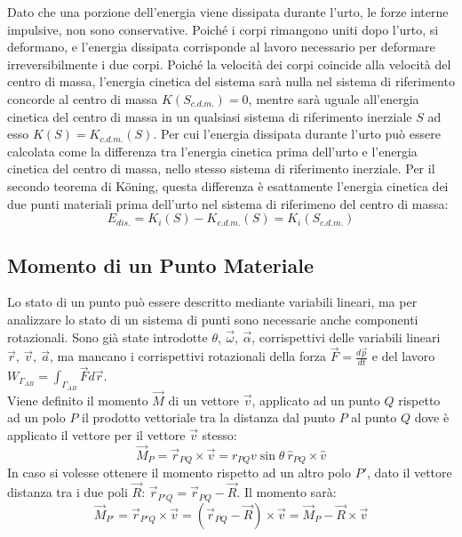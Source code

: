 \documentclass{article}
\numberwithin{equation}{subsection}
\begin{document}
Dato che una porzione dell'energia viene dissipata durante l'urto, le forze interne impulsive, non sono conservative. Poiché i corpi rimangono 
uniti dopo l'urto, si deformano, e l'energia dissipata corrisponde al lavoro necessario per deformare irreversibilmente i due corpi. 
Poiché la velocità dei corpi coincide alla velocità del centro di massa, 
l'energia cinetica del sistema sarà nulla nel sistema di 
riferimento concorde al centro di massa $K(S_{c.d.m.})=0$, mentre sarà uguale all'energia 
cinetica del centro di massa in un qualsiasi sistema di riferimento inerziale $S$ 
ad esso $K(S)=K_{c.d.m.}(S)$. Per cui l'energia dissipata durante l'urto può essere calcolata come la differenza tra l'energia cinetica prima dell'urto e 
l'energia cinetica del centro di massa, nello stesso sistema di riferimento inerziale. Per il secondo teorema di K\"oning, questa differenza è esattamente l'energia cinetica dei due punti materiali prima dell'urto 
nel sistema di riferimeno del centro di massa: 
\begin{equation}
    E_{dis.}=K_i(S)-K_{c.d.m.}(S)=K_i(S_{c.d.m.})
\end{equation}

\subsection{Momento di un Punto Materiale}


Lo stato di un punto può essere descritto mediante variabili 
lineari, ma per analizzare lo stato di un sistema di punti 
sono necessarie anche componenti rotazionali. Sono già state 
introdotte $\theta,\:\vec{\omega},\:\vec{\alpha}$, corrispettivi 
delle variabili lineari $\vec{r},\:\vec{v},\:\vec{a}$, ma 
mancano i corrispettivi rotazionali della forza $\vec{F}=\displaystyle\frac{d\vec{p}}{dt}$ 
e del lavoro $W_{\Gamma_{AB}}=\displaystyle\int_{\Gamma_{AB}}\vec{F}d\vec{r}$. 
\\
Viene definito il momento $\vec{M}$ di un vettore $\vec{v}$, applicato ad un punto $Q$ rispetto ad 
un polo $P$ il prodotto vettoriale tra la distanza dal punto 
$P$ al punto $Q$ dove è applicato il vettore per il vettore $\vec{v}$ stesso: 
\begin{equation*}
    \vec{M}_P=\vec{r}_{PQ}\times\vec{v}=r_{PQ}v\sin\theta\:\hat{r}_{PQ}\times\hat{v}
\end{equation*}
In caso si volesse ottenere il momento rispetto ad un altro polo 
$P'$, dato  il vettore distanza tra i due poli $\vec{R}$: 
$\vec{r}_{P'Q}=\vec{r}_{PQ}-\vec{R}$. Il momento sarà:
\begin{equation*}
    \vec{M}_{P'}=\vec{r}_{P'Q}\times\vec{v}=(\vec{r}_{PQ}-\vec{R})\times\vec{v}=\vec{M}_P-\vec{R}\times\vec{v}
\end{equation*}
\end{document}
